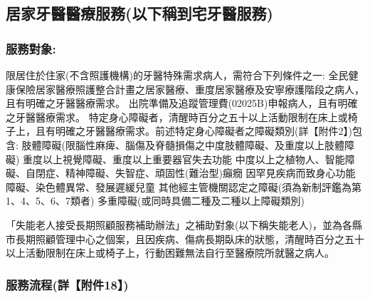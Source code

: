 
\subsection{居家牙醫醫療服務(以下稱到宅牙醫服務)}

\subsubsection{服務對象:}
\begin{outline}
\0 限居住於住家(不含照護機構)的牙醫特殊需求病人，需符合下列條件之一:
    \1 全民健康保險居家醫療照護整合計畫之居家醫療、重度居家醫療及安寧療護階段之病人，且有明確之牙醫醫療需求。
    \1 出院準備及追蹤管理費(02025B)申報病人，且有明確之牙醫醫療需求。
    \1 特定身心障礙者，清醒時百分之五十以上活動限制在床上或椅子上，且有明確之牙醫醫療需求。前述特定身心障礙者之障礙類別(詳【附件2】)包含:
        \2 肢體障礙(限腦性麻痺、腦傷及脊髓損傷之中度肢體障礙、及重度以上肢體障礙)
        \2 重度以上視覺障礙、重度以上重要器官失去功能
        \2 中度以上之植物人、智能障礙、自閉症、精神障礙、失智症、頑固性(難治型)癲癇
        \2 因罕見疾病而致身心功能障礙、染色體異常、發展遲緩兒童
        \2 其他經主管機關認定之障礙(須為新制評鑑為第1、4、5、6、7類者)
        \2 多重障礙(或同時具備二種及二種以上障礙類別)

    \1 「失能老人接受長期照顧服務補助辦法」之補助對象(以下稱失能老人)，並為各縣市長期照顧管理中心之個案，且因疾病、傷病長期臥床的狀態，清醒時百分之五十以上活動限制在床上或椅子上，行動困難無法自行至醫療院所就醫之病人。

\end{outline}

\subsubsection{服務流程(詳【附件18】)}
\label{certificate}


\setlength{\tabcolsep}{8pt}

